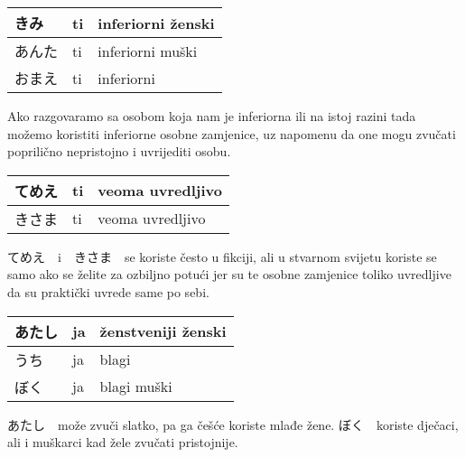 	\begin{reibun}
	\end{reibun}
	
	
	\vspace{10pt}
	\begin{tabular}{|l|l|l|}
		\hline
		きみ&ti&inferiorni ženski\\\hline
		あんた&ti&inferiorni muški\\\hline
		おまえ&ti&inferiorni\\\hline
	\end{tabular}
	
	\vspace{10pt}
	
		Ako razgovaramo sa osobom koja nam je inferiorna ili na istoj razini tada možemo koristiti inferiorne osobne zamjenice, uz napomenu da one mogu zvučati poprilično nepristojno i uvrijediti osobu.
		
	\vspace{10pt}
	
	\begin{tabular}{|l|l|l|}
		\hline
		てめえ&ti&veoma uvredljivo\\\hline
		きさま&ti&veoma uvredljivo\\\hline
	\end{tabular}
	
	\vspace{10pt}
	
		てめえ　i　きさま　se koriste često u fikciji, ali u stvarnom svijetu koriste se samo ako se želite za ozbiljno potući jer su te osobne zamjenice toliko uvredljive da su praktički uvrede same po sebi.
		
		\vspace{100pt}
		
	\begin{tabular}{|l|l|l|}
		\hline
		あたし&ja&ženstveniji ženski\\\hline
		うち&ja&blagi\\\hline
		ぼく&ja&blagi muški\\\hline
	\end{tabular}
	
	\vspace{10pt}
	
	あたし　može zvuči slatko, pa ga češće koriste mlađe žene. ぼく　koriste dječaci, ali i muškarci kad žele zvučati pristojnije.
	
	
	\vspace{10pt}
	
